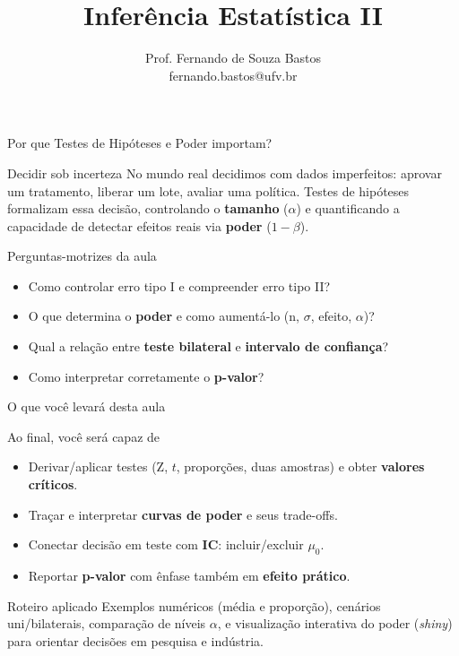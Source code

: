 \documentclass[12pt]{beamer}
\title{Inferência Estatística II}
\author{Prof. Fernando de Souza Bastos\texorpdfstring{\\ fernando.bastos@ufv.br}{}}
\institute{Departamento de Estatística\texorpdfstring{\\ Programa de Pós-Graduação em Estatística Aplicada e Biometria}\texorpdfstring{\\ Universidade Federal de Viçosa}{}\texorpdfstring{\\ Campus UFV - Viçosa}{}}
\date{}
\begin{document}

\frame{\titlepage}


\begin{frame}{Por que Testes de Hipóteses e Poder importam?}
	\begin{block}{Decidir sob incerteza}
		\justifying
		No mundo real decidimos com dados imperfeitos: aprovar um tratamento, liberar um lote, avaliar uma política. 
		Testes de hipóteses formalizam essa decisão, controlando o \textbf{tamanho} ($\alpha$) e quantificando a capacidade de detectar efeitos reais via \textbf{poder} ($1-\beta$).
	\end{block}
	
	\pause
	\begin{block}{Perguntas-motrizes da aula}
		\begin{itemize}[<+->]
			\item Como controlar erro tipo I e compreender erro tipo II?
			\item O que determina o \textbf{poder} e como aumentá-lo (n, $\sigma$, efeito, $\alpha$)?
			\item Qual a relação entre \textbf{teste bilateral} e \textbf{intervalo de confiança}?
			\item Como interpretar corretamente o \textbf{p-valor}?
		\end{itemize}
	\end{block}
\end{frame}

\begin{frame}{O que você levará desta aula}
	\begin{block}{Ao final, você será capaz de}
		\begin{itemize}[<+->]
			\item Derivar/aplicar testes (Z, $t$, proporções, duas amostras) e obter \textbf{valores críticos}.
			\item Traçar e interpretar \textbf{curvas de poder} e seus trade-offs.
			\item Conectar decisão em teste com \textbf{IC}: incluir/excluir $\mu_0$.
			\item Reportar \textbf{p-valor} com ênfase também em \textbf{efeito prático}.
		\end{itemize}
	\end{block}
	
	\pause
	\begin{block}{Roteiro aplicado}
		\justifying
		Exemplos numéricos (média e proporção), cenários uni/bilaterais, comparação de níveis $\alpha$, e visualização interativa do poder (\emph{shiny}) para orientar decisões em pesquisa e indústria.
	\end{block}
\end{frame}
\end{document}
